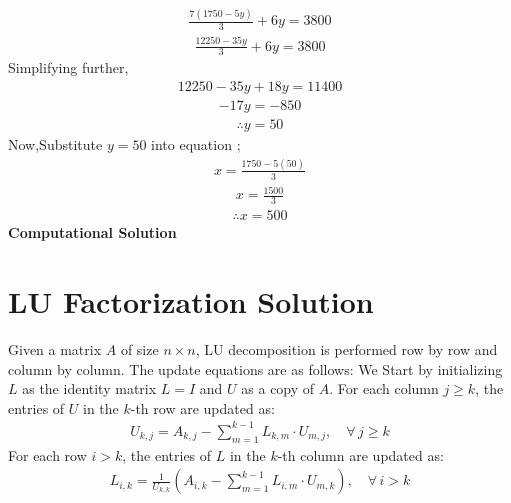 \documentclass[journal]{IEEEtran}
\begin{document}
\begin{align}
        \frac{7(1750 - 5y)}{3} + 6y= 3800 
\end{align}
\begin{align}
        \frac{12250 - 35y}{3} + 6y = 3800
\end{align}
Simplifying further,
\begin{align}
    12250 - 35y + 18y = 11400 
\end{align}
\begin{align}
    -17y = -850    
\end{align}
\begin{align}
       \therefore y = 50
\end{align}
Now,Substitute \(y = 50\) into equation ;
\begin{align}
    x = \frac{1750 - 5(50)}{3} 
\end{align}
\begin{align}
        x = \frac{1500}{3} 
\end{align}
\begin{align}
    \therefore x = 500
\end{align}
\textbf{Computational Solution}
\section*{LU Factorization Solution}
Given a matrix $A$ of size $n \times n$, LU decomposition is performed row by row and column by column. The update equations are as follows:
We Start by initializing $L$ as the identity matrix $L = I$ and $U$ as a copy of $A$.
For each column $j \geq k$, the entries of $U$ in the $k$-th row are updated as:
\begin{align}
U_{k,j} = A_{k,j} - \sum_{m=1}^{k-1} L_{k,m} \cdot U_{m,j}, \quad \forall \, j \geq k 
\end{align}
For each row $i > k$, the entries of $L$ in the $k$-th column are updated as:
\begin{align}
L_{i,k} = \frac{1}{U_{k,k}} \left( A_{i,k} - \sum_{m=1}^{k-1} L_{i,m} \cdot U_{m,k} \right), \quad \forall \, i > k 
\end{align}
\end{document}
